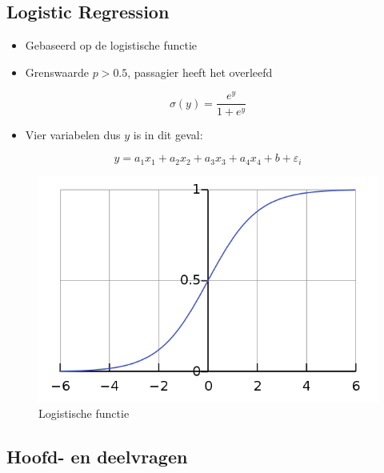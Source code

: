 \documentclass[11pt]{article}
\begin{document}
\subsection*{Logistic Regression}
\label{sec:org9d59dc8}

\begin{itemize}
\item Gebaseerd op de logistische functie
\item Grenswaarde \(p>0.5\), passagier heeft het overleefd
\end{itemize}

\begin{equation}
\label{eq:2}
\sigma(y) = \frac{e^y}{1+e^y}
\end{equation}

\begin{itemize}
\item Vier variabelen dus \(y\) is in dit geval:
\end{itemize}

\begin{equation}
y=a_1x_1+a_2x_2+a_3x_3+a_4x_4+b+\varepsilon_{i} 
\end{equation}

\begin{figure}[htbp]
\centering
\includegraphics[width=600]{./LogisticCurve.png}
\caption{Logistische functie}
\end{figure}


\subsection*{Hoofd- en deelvragen}
\label{sec:orge6a1a1c}
\end{document}
